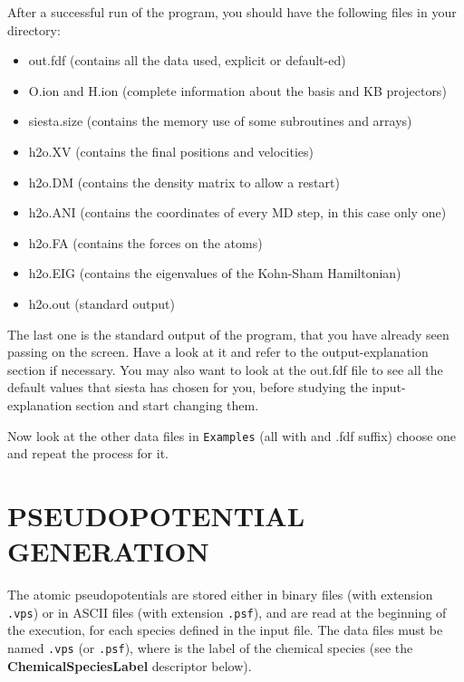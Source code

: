 \documentclass[11pt]{article}
\begin{document}
After a successful run of the program, you should have the following
files in your directory:
\begin{itemize}

\item out.fdf
 (contains all the data used, explicit or default-ed) 
\item O.ion and H.ion
 (complete information about the basis and KB projectors)
\item siesta.size
 (contains the memory use of some subroutines and arrays)
\item h2o.XV
 (contains the final positions and velocities)
\item h2o.DM
 (contains the density matrix to allow a restart)
\item h2o.ANI
 (contains the coordinates of every MD step, in this case only one)
\item h2o.FA
 (contains the forces on the atoms)
\item h2o.EIG
 (contains the eigenvalues of the Kohn-Sham Hamiltonian)
\item h2o.out
 (standard output)
\end{itemize}

The last one is the standard output of the program, that you
have already seen passing on the screen. Have a look at it
and refer to the output-explanation section if necessary.
You may also want to look at the out.fdf file to see all
the default values that siesta has chosen for you, before
studying the input-explanation section and start changing them.

Now look at the other data files in {\tt Examples}
(all with and .fdf suffix) choose one and repeat the process for it.


\section{PSEUDOPOTENTIAL GENERATION}


The atomic pseudopotentials are stored either in binary files (with
extension {\tt .vps}) or in ASCII files (with extension {\tt .psf}),
and are read at the beginning of the execution, for each species
defined in the input file. The data files must be named {\tt *.vps}
(or {\tt *.psf}), where {\tt *} is the label of the chemical species
(see the {\bf ChemicalSpeciesLabel} descriptor below).
\end{document}
